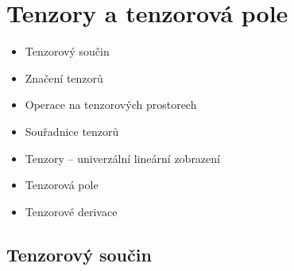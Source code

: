 \shorthandoff{-}%
\providecommand{\gmIpetT}[3]{\tikz[baseline=(gmb.base),line width=0.5pt]{%
  \node[draw,inner sep=1.2pt,minimum width=1.2em,minimum height=1.1em] (gmb) {$\scriptstyle #1$};%
  \foreach \o/\t in {#2}{\draw[gmIpet\t] ($(gmb.north)+(\o em,0)$) -- ++(0,0.7em);}%
  \foreach \o/\t in {#3}{\draw[gmIpet\t] ($(gmb.south)+(\o em,0)$) -- ++(0,-0.7em);}}}
\shorthandon{-}%

\section{Tenzory a tenzorová pole}

\begin{itemize}[nosep]
  \item Tenzorový součin
  \item Značení tenzorů
  \item Operace na tenzorových prostorech
  \item Souřadnice tenzorů
  \item Tenzory -- univerzální lineární zobrazení
  \item Tenzorová pole
  \item Tenzorové derivace
\end{itemize}

\subsection{Tenzorový součin}

